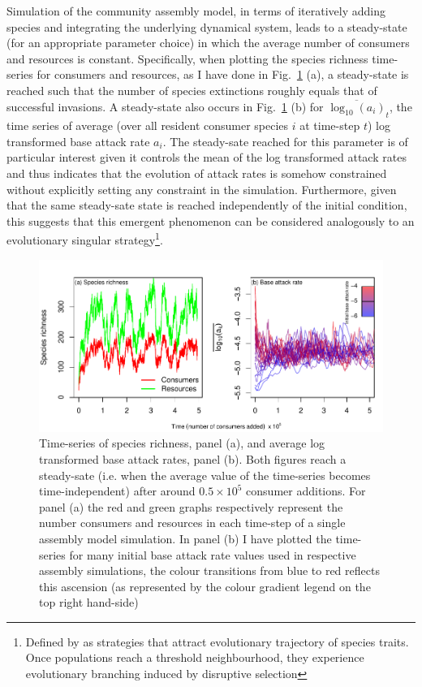 \documentclass[a4paper]{report}
\DeclareMathOperator{\log}{log}
\begin{document}
Simulation of the community assembly model, in terms of iteratively adding species and integrating the underlying dynamical system, leads to a steady-state (for an appropriate parameter choice) in which the average number of consumers and resources is constant. Specifically, when plotting the species richness time-series for consumers and resources, as I have done in Fig.~\ref{fig:spec_a_full} (a), a steady-state is reached such that the number of species extinctions roughly equals that of successful invasions. A steady-state also occurs in Fig.~\ref{fig:spec_a_full} (b) for $\overline{\log_{10}(a_{i})}_t$, the time series of average (over all resident consumer species $i$ at time-step $t$) log transformed base attack rate $a_i$. The steady-sate reached for this parameter is of particular interest given it controls the mean of the log transformed attack rates and thus indicates that the evolution of attack rates is somehow constrained without explicitly setting any constraint in the simulation. Furthermore, given that the same steady-sate state is reached independently of the initial condition, this suggests that this emergent phenomenon can be considered analogously to an evolutionary singular strategy\footnote{Defined by \citep{Kisdi1998} as strategies that attract evolutionary trajectory of species traits. Once populations reach a threshold neighbourhood, they experience evolutionary branching induced by disruptive selection}.

 
\begin{figure}[H]

\centering{}
\includegraphics[scale=1]{../Images/spec_a_full.pdf}
 \caption{\label{fig:spec_a_full} Time-series of species richness, panel (a), and average log transformed base attack rates, panel (b). Both figures reach a steady-sate (i.e. when the average value of the time-series becomes time-independent) after around $0.5 \times 10^5$ consumer additions. For panel (a) the red and green graphs respectively represent the number consumers and resources in each time-step of a single assembly model simulation. In panel (b) I have plotted the time-series for many initial base attack rate values used in respective assembly simulations, the colour transitions from blue to red reflects this ascension (as represented by the colour gradient legend on the top right hand-side)}
\end{figure}
\end{document}
